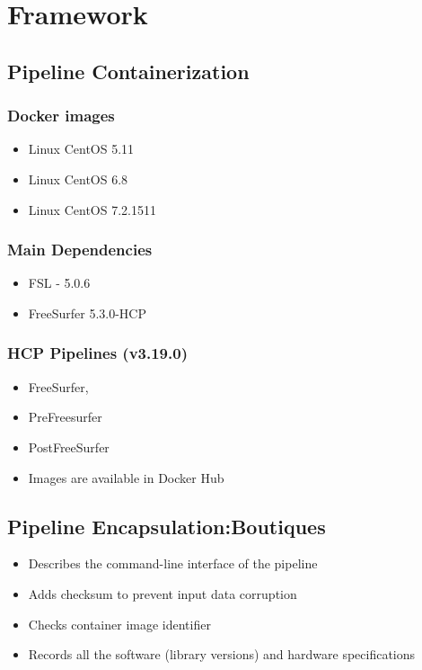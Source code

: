 \section{Framework}
\subsection{Pipeline Containerization}
\subsubsection{Docker images}
\begin{itemize}
  \item Linux CentOS 5.11
  \item Linux CentOS 6.8 
  \item Linux CentOS 7.2.1511
\end{itemize}

\subsubsection{Main Dependencies}
\begin{itemize}
  \item FSL - 5.0.6
  \item FreeSurfer 5.3.0-HCP
\end{itemize}

\subsubsection{HCP Pipelines (v3.19.0)}
\begin{itemize}
  \item FreeSurfer,
  \item PreFreesurfer
  \item PostFreeSurfer
  \item Images are available in Docker Hub
\end{itemize}

\subsection{Pipeline Encapsulation:Boutiques}
\begin{itemize}
  \item Describes the command-line interface of the pipeline
  \item Adds checksum to prevent input data corruption
  \item Checks container image identifier
  \item Records all the software (library versions) and hardware specifications
\end{itemize}


